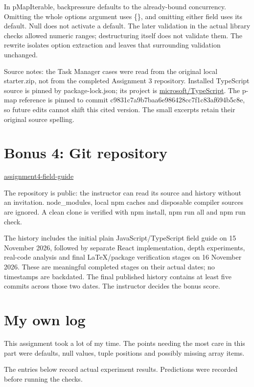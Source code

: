 \documentclass[
  10pt,
  a4paper,
]{article}
\begin{document}
In pMapIterable, backpressure defaults to the already-bound concurrency.
Omitting the whole options argument uses \{\}, and omitting either field
uses its default. Null does not activate a default. The later validation
in the actual library checks allowed numeric ranges; destructuring
itself does not validate them. The rewrite isolates option extraction
and leaves that surrounding validation unchanged.

Source notes: the Task Manager cases were read from the original local
starter.zip, not from the completed Assignment 3 repository. Installed
TypeScript source is pinned by package-lock.json; its project is
\href{https://github.com/microsoft/TypeScript}{microsoft/TypeScript}.
The p-map reference is pinned to commit
c9831c7a9b7baa6e986428cc7f1c83af694b5c8e, so future edits cannot shift
this cited version. The small excerpts retain their original source
spelling.

\section{Bonus 4: Git repository}\label{bonus-4-git-repository}

\href{https://github.com/Hurulayn0/assignment4-field-guide}{assignment4-field-guide}

The repository is public: the instructor can read its source and history
without an invitation. node\_modules, local npm caches and disposable
compiler sources are ignored. A clean clone is verified with npm
install, npm run all and npm run check.

The history includes the initial plain JavaScript/TypeScript field guide
on 15 November 2026, followed by separate React implementation, depth
experiments, real-code analysis and final LaTeX/package verification
stages on 16 November 2026. These are meaningful completed stages on
their actual dates; no timestamps are backdated. The final published
history contains at least five commits across those two dates. The
instructor decides the bonus score.

\section{My own log}\label{my-own-log}

This assignment took a lot of my time. The points needing the most care
in this part were defaults, null values, tuple positions and possibly
missing array items.

The entries below record actual experiment results. Predictions were
recorded before running the checks.
\end{document}
